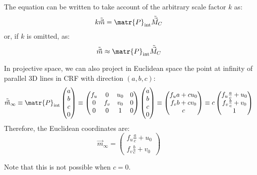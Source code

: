 \begin{description}
        \begin{remark}
            The equation can be written to take account of the arbitrary scale factor $k$ as:
            \[ k\tilde{\vec{m}} = \matr{P}_\text{int} \tilde{\vec{M}}_C \]
            or, if $k$ is omitted, as:
            \[ \tilde{\vec{m}} \approx \matr{P}_\text{int} \tilde{\vec{M}}_C \]
        \end{remark}

        \begin{remark}
            In projective space, we can also project in Euclidean space the point at infinity of parallel 3D lines in CRF with direction $(a, b, c)$:
            \[ 
                \tilde{\vec{m}}_\infty \equiv 
                    \matr{P}_\text{int} \begin{pmatrix} a \\ b \\ c \\ 0 \end{pmatrix} \equiv
                    \begin{pmatrix} f_u & 0 & u_0 & 0 \\ 0 & f_v & v_0 & 0 \\ 0 & 0 & 1 & 0 \end{pmatrix} \begin{pmatrix} a \\ b \\ c \\ 0 \end{pmatrix} \equiv
                    \begin{pmatrix} f_u a + c u_0 \\ f_v b + c v_0 \\ c \end{pmatrix} \equiv
                    c\begin{pmatrix} f_u \frac{a}{c} + u_0 \\ f_v \frac{b}{c} + v_0 \\ 1 \end{pmatrix}
            \]
            Therefore, the Euclidean coordinates are:
            \[ \vec{m}_\infty = \begin{pmatrix} f_u \frac{a}{c} + u_0 \\ f_v \frac{b}{c} + v_0 \end{pmatrix} \]
            
            Note that this is not possible when $c = 0$.
        \end{remark}
\end{description}